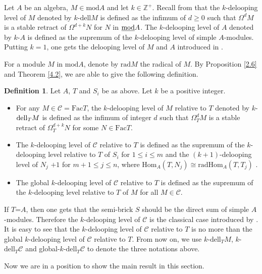 \documentclass[a4paper]{amsart}
\theoremstyle{definition}
\newtheorem{defn}[thm]{Definition}
\theoremstyle{remark}
\numberwithin{equation}{section}
\begin{document}
  Let $A$ be an algebra, $M\in \text{mod}A$ and let $ k \in \mathbb{Z^+}$. Recall from \cite{GuI} that the $k$-delooping level of $M$ denoted by $k$-$\text{dell}M$ is defined as the infimum of $d\geq 0$ such that $\Omega^d M$ is a stable retract of $\Omega^{d+k}N$ for $N$ in $\text{\underline{mod}}A$. The $k$-delooping level of $A$ denoted by $k$-$A$ is defined as the supremum of the $k$-delooping level of simple $A$-modules. Putting $k=1$, one gets the delooping level of $M$ and $A$ introduced in \cite{G}.

For a module $M$ in $\text{mod}A$, denote by $\text{rad} M$ the radical of $M$. By Proposition \ref{2.6} and Theorem \ref{4.2}, we are able to give the following definition.

\begin{defn}\label{4.1} Let $A$, $T$ and $S_i$ be as above. Let $k$ be a positive integer.
\begin{itemize}
\item [(1)] For any $ M\in \mathcal{C}=\text{Fac}T$, the $k$-delooping level of $M$ relative to $T$ denoted by $k$-${\rm dell}_T M$ is defined as the infimum of integer $d$ such that $\Omega_{T}^{d} M$ is a stable retract of $\Omega_T^{d+k}N$ for some $N\in \text{Fac}T$.
\item [(2)] The $k$-delooping level of $\mathcal{C}$ relative to $T$ is defined as the supremum of the $k$-delooping level relative to $T$ of $S_i$ for $1\leq i\leq m$ and the $(k+1)$-delooping level of $N_j$ $+1$ for $m+1\leq j\leq n$, where $\text{Hom}_A(T,N_j)\cong \text{rad}\text{Hom}_A(T,T_j)$ .
\item [(3)] The global $k$-delooping level of $\mathcal{C}$ relative to $T$ is defined as the  supremum of the $k$-delooping level relative to $T$ of $M$ for all $M\in\mathcal{C}$.
\end{itemize}
\end{defn}
 If $T$=$A$, then one gets that the semi-brick $S$ should be the direct sum of simple $A$-modules. Therefore the $k$-delooping level of $\mathcal{C}$ is the classical case introduced by \cite{GuI}. It is easy to see that the $k$-delooping level of $\mathcal{C}$ relative to $T$ is no more than the global $k$-delooping level of $\mathcal{C}$ relative to $T$. From now on, we use $k$-$\text{dell}_TM$, $k$-$\text{dell}_T\mathcal{C}$ and global-$k$-$\text{dell}_T\mathcal{C}$ to denote the three notations above.

Now we are in a position to show the main result in this section.
\end{document}
